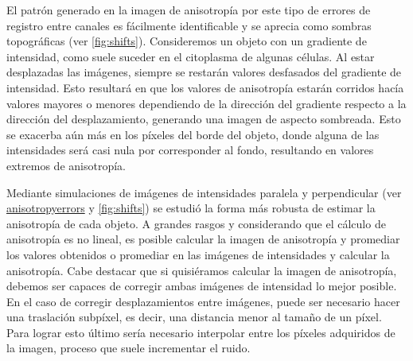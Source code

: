 El patrón generado en la imagen de anisotropía por este tipo de errores de registro entre canales es fácilmente identificable y se aprecia como sombras topográficas (ver  \cref{fig:shifts}). Consideremos un objeto con un gradiente de intensidad, como suele suceder en el citoplasma de algunas células. Al estar desplazadas las imágenes, siempre se restarán valores desfasados del gradiente de intensidad. Esto resultará en que los valores de anisotropía estarán corridos hacía valores mayores o menores dependiendo de la dirección del gradiente respecto a la dirección del desplazamiento, generando una imagen de aspecto sombreada. Esto se exacerba aún más en los píxeles del borde del objeto, donde alguna de las intensidades será casi nula por corresponder al fondo, resultando en valores extremos de anisotropía.

Mediante simulaciones de imágenes de intensidades paralela y perpendicular (ver \href{https://github.com/acorbat/anisotropy_errors/tree/master/anisotropy_errors}{anisotropy\textunderscore errors} y \cref{fig:shifts}) se estudió la forma más robusta de estimar la anisotropía de cada objeto. A grandes rasgos y considerando que el cálculo de anisotropía es no lineal, es posible calcular la imagen de anisotropía y promediar los valores obtenidos o promediar en las imágenes de intensidades y calcular la anisotropía. Cabe destacar que si quisiéramos calcular la imagen de anisotropía, debemos ser capaces de corregir ambas imágenes de intensidad lo mejor posible. En el caso de corregir desplazamientos entre imágenes, puede ser necesario hacer una traslación subpíxel, es decir, una distancia menor al tamaño de un píxel. Para lograr esto último sería necesario interpolar entre los píxeles adquiridos de la imagen, proceso que suele incrementar el ruido.

